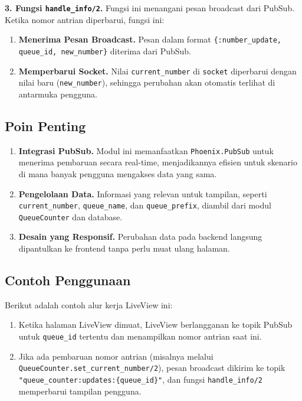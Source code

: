 \textbf{3. Fungsi \texttt{handle\_info/2}.} Fungsi ini menangani pesan broadcast dari PubSub. Ketika nomor antrian diperbarui, fungsi ini:
\begin{enumerate}
	\item \textbf{Menerima Pesan Broadcast.} Pesan dalam format \texttt{\{:number\_update, queue\_id, new\_number\}} diterima dari PubSub.
	\item \textbf{Memperbarui Socket.} Nilai \texttt{current\_number} di \texttt{socket} diperbarui dengan nilai baru (\texttt{new\_number}), sehingga perubahan akan otomatis terlihat di antarmuka pengguna.
\end{enumerate}

\subsection{Poin Penting}

\begin{enumerate}
	\item \textbf{Integrasi PubSub.} Modul ini memanfaatkan \texttt{Phoenix.PubSub} untuk menerima pembaruan secara real-time, menjadikannya efisien untuk skenario di mana banyak pengguna mengakses data yang sama.
	\item \textbf{Pengelolaan Data.} Informasi yang relevan untuk tampilan, seperti \texttt{current\_number}, \texttt{queue\_name}, dan \texttt{queue\_prefix}, diambil dari modul \texttt{QueueCounter} dan database.
	\item \textbf{Desain yang Responsif.} Perubahan data pada backend langsung dipantulkan ke frontend tanpa perlu muat ulang halaman.
\end{enumerate}

\subsection{Contoh Penggunaan}

Berikut adalah contoh alur kerja LiveView ini:
\begin{enumerate}
	\item Ketika halaman LiveView dimuat, LiveView berlangganan ke topik PubSub untuk \texttt{queue\_id} tertentu dan menampilkan nomor antrian saat ini.
	\item Jika ada pembaruan nomor antrian (misalnya melalui \texttt{QueueCounter.set\_current\_number/2}), pesan broadcast dikirim ke topik \texttt{"queue\_counter:updates:\{queue\_id\}"}, dan fungsi \texttt{handle\_info/2} memperbarui tampilan pengguna.
\end{enumerate}

